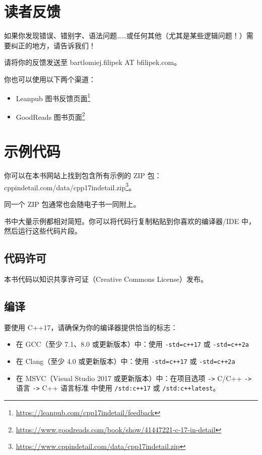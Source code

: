 \section{读者反馈}

如果你发现错误、错别字、语法问题……或任何其他（尤其是某些逻辑问题！）需要纠正的地方，请告诉我们！

请将你的反馈发送至 bartlomiej.filipek AT bfilipek.com。

你也可以使用以下两个渠道：

\begin{itemize}
  \item Leanpub 图书反馈页面\footnote{\url{https://leanpub.com/cpp17indetail/feedback}}
  \item GoodReads 图书页面\footnote{\url{https://www.goodreads.com/book/show/41447221-c-17-in-detail}}
\end{itemize}

\section{示例代码}

你可以在本书网站上找到包含所有示例的 ZIP 包：cppindetail.com/data/cpp17indetail.zip\footnote{\url{https://www.cppindetail.com/data/cpp17indetail.zip}}。

同一个 ZIP 包通常也会随电子书一同附上。

书中大量示例都相对简短。你可以将代码行复制粘贴到你喜欢的编译器/IDE 中，然后运行这些代码片段。

\subsection{代码许可}

本书代码以知识共享许可证（Creative Commons License）发布。

\subsection{编译}

要使用 C++17，请确保为你的编译器提供恰当的标志：

\begin{itemize}
  \item 在 GCC（至少 7.1、8.0 或更新版本）中：使用 \texttt{-std=c++17} 或 \texttt{-std=c++2a}
  \item 在 Clang（至少 4.0 或更新版本）中：使用 \texttt{-std=c++17} 或 \texttt{-std=c++2a}
  \item 在 MSVC（Visual Studio 2017 或更新版本）中：在项目选项 \texttt{->} C/C++ \texttt{->} 语言 \texttt{->} C++ 语言标准 中使用 \texttt{/std:c++17} 或 \texttt{/std:c++latest}。
\end{itemize}

